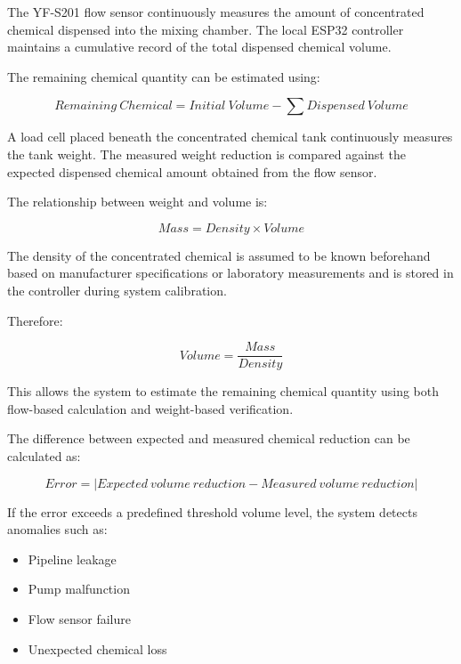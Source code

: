 \documentclass[12pt,a4paper]{report}
\begin{document}
The YF-S201 flow sensor continuously measures the amount of concentrated chemical dispensed into the mixing chamber. The local ESP32 controller maintains a cumulative record of the total dispensed chemical volume.

\noindent The remaining chemical quantity can be estimated using:

\begin{equation}
Remaining\ Chemical = Initial\ Volume - \sum Dispensed\ Volume
\end{equation}

A load cell placed beneath the concentrated chemical tank continuously measures the tank weight. The measured weight reduction is compared against the expected dispensed chemical amount obtained from the flow sensor.

\noindent The relationship between weight and volume is:

\begin{equation}
Mass = Density \times Volume
\end{equation}

The density of the concentrated chemical is assumed to be known beforehand based on manufacturer specifications or laboratory measurements and is stored in the controller during system calibration.

Therefore:

\begin{equation}
Volume = \frac{Mass}{Density}
\end{equation}

This allows the system to estimate the remaining chemical quantity using both flow-based calculation and weight-based verification.

\noindent The difference between expected and measured chemical reduction can be calculated as:

\begin{equation}
Error = |Expected\ volume\ reduction - Measured\ volume\ reduction|
\end{equation}

If the error exceeds a predefined threshold volume level, the system detects anomalies such as:

\begin{itemize}
    \item Pipeline leakage
    \item Pump malfunction
    \item Flow sensor failure
    \item Unexpected chemical loss
\end{itemize}
\end{document}
